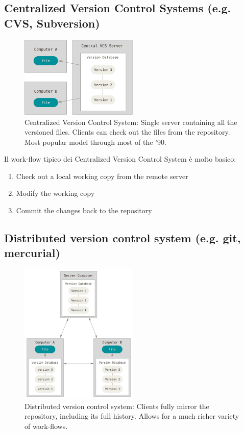\subsection{Centralized Version Control Systems (e.g. CVS, Subversion)}

\begin{figure}[ht]
    \centering
    \includegraphics[width=0.5\textwidth]{lez1/centralVCS.png}
    \caption{Centralized Version Control System: Single server containing all the versioned files. Clients can check out the files from the repository. Most popular model through most of the ’90.}
    \label{centralVCS}
\end{figure}
\FloatBarrier

Il work-flow tipico dei Centralized Version Control System è molto basico:
\begin{enumerate}
    \setlength\itemsep{0.1em}
    \item Check out a local working copy from the remote server
    \item Modify the working copy
    \item Commit the changes back to the repository
\end{enumerate}

\newpage
\subsection{Distributed version control system (e.g. git, mercurial)}



\begin{figure}[ht]
    \centering
    \includegraphics[width=0.5\textwidth]{lez1/distributedVCS.png}
    \caption{Distributed version control system: Clients fully mirror the repository, including its full history. Allows for a much richer variety of work-flows.}
    \label{distrVCS}
\end{figure}
\FloatBarrier


